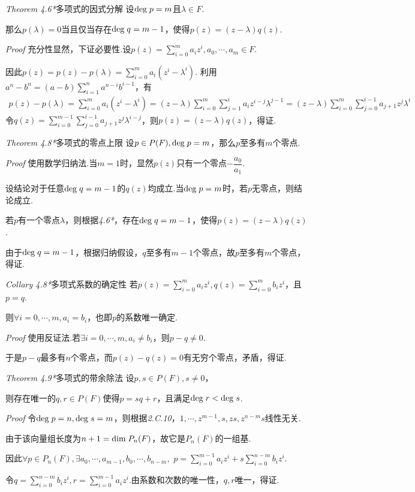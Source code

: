 \textit{Theorem 4.6*}{\kaishu 多项式的因式分解}
设\(\mathrm{deg \;} p=m\)且\(\lambda \in F\).

那么\(p(\lambda)=0\)当且仅当存在\(\mathrm{deg \;} q=m-1\)，使得\(p(z)=(z-\lambda)q(z)\).

\textit{Proof}
充分性显然，下证必要性.设\(p(z)=\sum_{i=0}^m a_iz^i,a_0,\cdots,a_m \in F\).

因此\(p(z)=p(z)-p(\lambda)=\sum_{i=0}^m a_i(z^i-\lambda^i)\).
利用\(a^n-b^n=(a-b)\sum_{i=1}^n a^{n-i}b^{i-1}\)，有
    \begin{align*}
        p(z)-p(\lambda)=\sum_{i=0}^m a_i(z^i-\lambda^i)
                       =(z-\lambda)\sum_{i=0}^m \sum_{j=1}^i a_iz^{i-j}\lambda^{j-1}
                       =(z-\lambda)\sum_{i=0}^m \sum_{j=0}^{i-1} a_{j+1}z^j\lambda^i
    \end{align*}
令\(q(z)=\sum_{i=0}^{m-1} \sum_{j=0}^{i-1} a_{j+1}z^j\lambda^{i-j}\)，则\(p(z)=(z-\lambda)q(z)\)，得证.

\hspace*{\fill}

\textit{Theorem 4.8*}{\kaishu 多项式的零点上限}
设\(p \in P(F),\mathrm{deg \;} p=m\)，那么\(p\)至多有\(m\)个零点.

\textit{Proof}
使用数学归纳法.当\(m=1\)时，显然\(p(z)\)只有一个零点\(-\dfrac{a_0}{a_1}\).

设结论对于任意\(\mathrm{deg \;} q=m-1\)的\(q(z)\)均成立.当\(\mathrm{deg \;} p=m\)时，若\(p\)无零点，则结论成立.

若\(p\)有一个零点\(\lambda\)，则根据\textit{4.6*}，存在\(\mathrm{deg \;} q=m-1\)，使得\(p(z)=(z-\lambda)q(z)\).

由于\(\mathrm{deg \;} q=m-1\)，根据归纳假设，\(q\)至多有\(m-1\)个零点，故\(p\)至多有\(m\)个零点，得证.

\hspace*{\fill}

\textit{Collary 4.8*}{\kaishu 多项式系数的确定性}
若\(p(z)=\sum_{i=0}^m a_iz^i,q(z)=\sum_{i=0}^m b_iz^i\)，且\(p=q\).

则\(\forall i=0,\cdots,m,a_i=b_i\)，也即\(p\)的系数唯一确定.

\textit{Proof}
使用反证法.若\(\exists i=0,\cdots,m,a_i \ne b_i\)，则\(p-q \ne 0\).

于是\(p-q\)最多有\(n\)个零点，而\(p(z)-q(z)=0\)有无穷个零点，矛盾，得证.

\hspace*{\fill}

\textit{Theorem 4.9*}{\kaishu 多项式的带余除法}
设\(p,s \in P(F),s \ne 0\)，

则存在唯一的\(q,r \in P(F)\)使得\(p=sq+r\)，且满足\(\mathrm{deg \;} r<\mathrm{deg \;} s\).

\textit{Proof}
令\(\mathrm{deg \;} p=n,\mathrm{deg \;} s=m\)，则根据\textit{2.C.10}，\(1,\cdots,z^{m-1},s,zs,z^{n-m}s\)线性无关.

由于该向量组长度为\(n+1=\mathrm{dim \;} P_n(F)\)，故它是\(P_n(F)\)的一组基.

因此\(\forall p \in P_n(F),\exists a_0,\cdots,a_{m-1},b_0,\cdots,b_{n-m},\)
\(p=\sum_{i=0}^{m-1}a_iz^i+s\sum_{i=0}^{n-m}b_iz^i\).

令\(q=\sum_{i=0}^{n-m}b_iz^i,r=\sum_{i=0}^{m-1}a_iz^i\).由系数和次数的唯一性，\(q,r\)唯一，得证.



